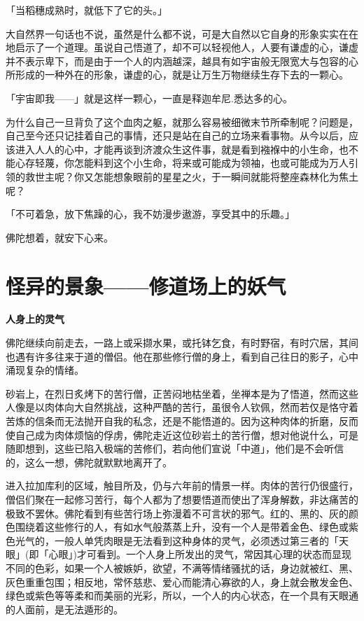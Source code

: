 \documentclass[twoside,openany]{book}
\newcommand{\mt}[1]{\textbullet \textbf{#1}}
\begin{document}
「当稻穗成熟时，就低下了它的头。」

大自然界一句话也不说，虽然是什么都不说，可是大自然以它自身的形象实实在在地启示了一个道理。虽说自己悟道了，却不可以轻视他人，人要有谦虚的心，谦虚并不表示卑下，而是由于一个人的内涵越深，越具有如宇宙般无限宽大与包容的心所形成的一种外在的形象，谦虚的心，就是让万生万物继续生存下去的一颗心。

「宇宙即我——」就是这样一颗心，一直是释迦牟尼.悉达多的心。

为什么自己一旦背负了这个血肉之躯，就那么容易被细微末节所牵制呢？问题是，自己至今还只记挂着自己的事情，还只是站在自己的立场来看事物。从今以后，应该进入人人的心中，才能再谈到济渡众生这件事，就是看到襁褓中的小生命，也不能心存轻蔑，你怎能料到这个小生命，将来或可能成为领袖，也或可能成为万人引领的救世主呢？你又怎能想象眼前的星星之火，于一瞬间就能将整座森林化为焦土呢？

「不可着急，放下焦躁的心，我不妨漫步遨游，享受其中的乐趣。」

佛陀想着，就安下心来。

\section{怪异的景象——修道场上的妖气}\label{sec2.3}

\mt{人身上的灵气}

佛陀继续向前走去，一路上或采撷水果，或托钵乞食，有时野宿，有时穴居，其间也遇有许多往来于道的僧侣。他在那些修行僧的身上，看到自己往日的影子，心中涌现复杂的情绪。

砂岩上，在烈日炙烤下的苦行僧，正苦闷地枯坐着，坐禅本是为了悟道，然而这些人像是以肉体向大自然挑战，这种严酷的苦行，虽很令人钦佩，然而若仅是恪守着苦炼的信条而无法抛开自我的私念，还是不能悟道的。因为这种肉体的折磨，反而使自己成为肉体烦恼的俘虏，佛陀走近这位砂岩土的苦行僧，想对他说什么，可是随即想到，这些已陷入极端的苦修们，若向他们宣说「中道」，他们是不会听信的，这么一想，佛陀就默默地离开了。

进入拉加库利的区域，触目所及，仍与六年前的情景一样。肉体的苦行仍很盛行，僧侣们聚在一起修习苦行，每个人都为了想要悟道而使出了浑身解数，非达痛苦的极致不罢休。佛陀看到有些苦行场上弥漫着不可言状的邪气。红的、黑的、灰的颜色围绕着这些修行的人，有如水气般蒸蒸上升，没有一个人是带着金色、绿色或紫色光气的，一般人单凭肉眼是无法看到这种身体的灵气，必须透过第三者的「天眼」(即「心眼」)才可看到。一个人身上所发出的灵气，常因其心理的状态而显现不同的色彩，如果一个人被嫉妒，欲望，不满等情绪骚扰的话，身边就被红、黑、灰色重重包围；相反地，常怀慈悲、爱心而能清心寡欲的人，身上就会散发金色、绿色或紫色等等柔和而美丽的光彩，所以，一个人的内心状态，在一个具有天眼通的人面前，是无法遁形的。
\end{document}
